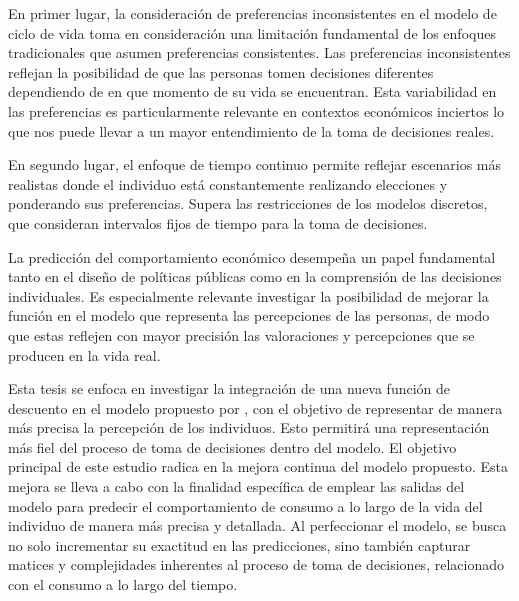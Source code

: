 En primer lugar, la consideración de preferencias inconsistentes en el modelo de ciclo de vida toma en consideración una limitación fundamental de los enfoques tradicionales que asumen preferencias consistentes. Las preferencias inconsistentes reflejan la posibilidad de que las personas tomen decisiones diferentes dependiendo de en que momento de su vida se encuentran. Esta variabilidad en las preferencias es particularmente relevante en contextos económicos inciertos lo que nos puede llevar a un mayor entendimiento de la toma de decisiones reales.

En segundo lugar, el enfoque de tiempo continuo permite reflejar escenarios más realistas donde el individuo está constantemente realizando elecciones y ponderando sus preferencias. Supera las restricciones de los modelos discretos, que consideran intervalos fijos de tiempo para la toma de decisiones. 

La predicción del comportamiento económico desempeña un papel fundamental tanto en el diseño de políticas públicas como en la comprensión de las decisiones individuales. Es especialmente relevante investigar la posibilidad de mejorar la función en el modelo que representa las percepciones de las personas, de modo que estas reflejen con mayor precisión las valoraciones y percepciones que se producen en la vida real. 

Esta tesis se enfoca en investigar la integración de una nueva función de descuento en el modelo propuesto por \parencite{feigenbaum2021deviation}, con el objetivo de representar de manera más precisa la percepción de los individuos. Esto permitirá una representación más fiel del proceso de toma de decisiones dentro del modelo.   
El objetivo principal de este estudio radica en la mejora continua del modelo propuesto. Esta mejora se lleva a cabo con la finalidad específica de emplear las salidas del modelo para predecir el comportamiento de consumo a lo largo de la vida del individuo de manera más precisa y detallada. Al perfeccionar el modelo, se busca no solo incrementar su exactitud en las predicciones, sino también capturar matices y complejidades inherentes al proceso de toma de decisiones, relacionado con el consumo a lo largo del tiempo. 

